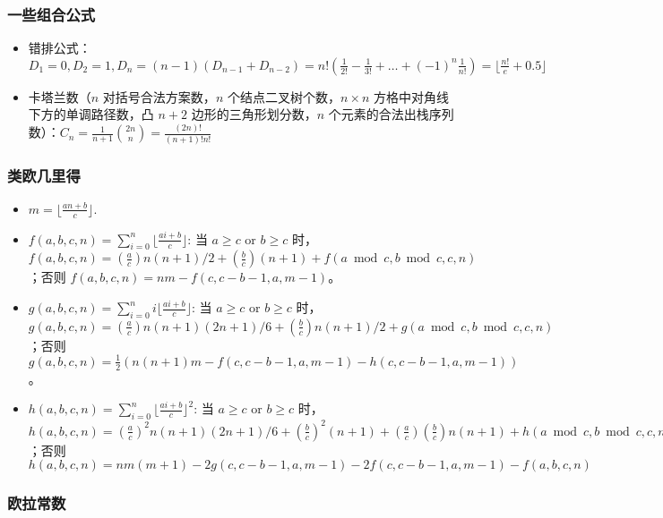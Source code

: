\documentclass[]{article}
\providecommand{\tightlist}{%
  \setlength{\itemsep}{0pt}\setlength{\parskip}{0pt}}
\begin{document}
\hypertarget{ux4e00ux4e9bux7ec4ux5408ux516cux5f0f}{%
\subsubsection{一些组合公式}\label{ux4e00ux4e9bux7ec4ux5408ux516cux5f0f}}

\begin{itemize}
\tightlist
\item
  错排公式：\(D_1=0,D_2=1,D_n=(n-1)(D_{n-1} + D_{n-2})=n!(\frac 1{2!}-\frac 1{3!}+\dots + (-1)^n\frac 1{n!})=\lfloor \frac{n!}e + 0.5 \rfloor\)
\item
  卡塔兰数（\(n\) 对括号合法方案数，\(n\)
  个结点二叉树个数，\(n\times n\) 方格中对角线下方的单调路径数，凸
  \(n+2\) 边形的三角形划分数，\(n\)
  个元素的合法出栈序列数）：\(C_n=\frac 1{n+1}\binom {2n}n=\frac{(2n)!}{(n+1)!n!}\)
\end{itemize}

\hypertarget{ux7c7bux6b27ux51e0ux91ccux5f97}{%
\subsubsection{类欧几里得}\label{ux7c7bux6b27ux51e0ux91ccux5f97}}

\begin{itemize}
\tightlist
\item
  \(m = \lfloor \frac{an+b}{c} \rfloor\).
\item
  \(f(a,b,c,n)=\sum_{i=0}^n\lfloor\frac{ai+b}{c}\rfloor\): 当
  \(a \ge c\) or \(b \ge c\)
  时，\(f(a,b,c,n)=(\frac{a}{c})n(n+1)/2+(\frac{b}{c})(n+1)+f(a \bmod c,b \bmod c,c,n)\)；否则
  \(f(a,b,c,n)=nm-f(c,c-b-1,a,m-1)\)。
\item
  \(g(a,b,c,n)=\sum_{i=0}^n i \lfloor\frac{ai+b}{c}\rfloor\): 当
  \(a \ge c\) or \(b \ge c\)
  时，\(g(a,b,c,n)=(\frac{a}{c})n(n+1)(2n+1)/6+(\frac{b}{c})n(n+1)/2+g(a \bmod c,b \bmod c,c,n)\)；否则
  \(g(a,b,c,n)=\frac{1}{2} (n(n+1)m-f(c,c-b-1,a,m-1)-h(c,c-b-1,a,m-1))\)。
\item
  \(h(a,b,c,n)=\sum_{i=0}^n\lfloor \frac{ai+b}{c} \rfloor^2\): 当
  \(a \ge c\) or \(b \ge c\)
  时，\(h(a,b,c,n)=(\frac{a}{c})^2 n(n+1)(2n+1)/6 +(\frac{b}{c})^2 (n+1)+(\frac{a}{c})(\frac{b}{c})n(n+1)+h(a \bmod c, b \bmod c,c,n)+2(\frac{a}{c})g(a \bmod c,b \bmod c,c,n)+2(\frac{b}{c})f(a \bmod c,b \bmod c,c,n)\)；否则
  \(h(a,b,c,n)=nm(m+1)-2g(c,c-b-1,a,m-1)-2f(c,c-b-1,a,m-1)-f(a,b,c,n)\)
\end{itemize}

\hypertarget{ux6b27ux62c9ux5e38ux6570}{%
\subsubsection{欧拉常数}\label{ux6b27ux62c9ux5e38ux6570}}
\end{document}
